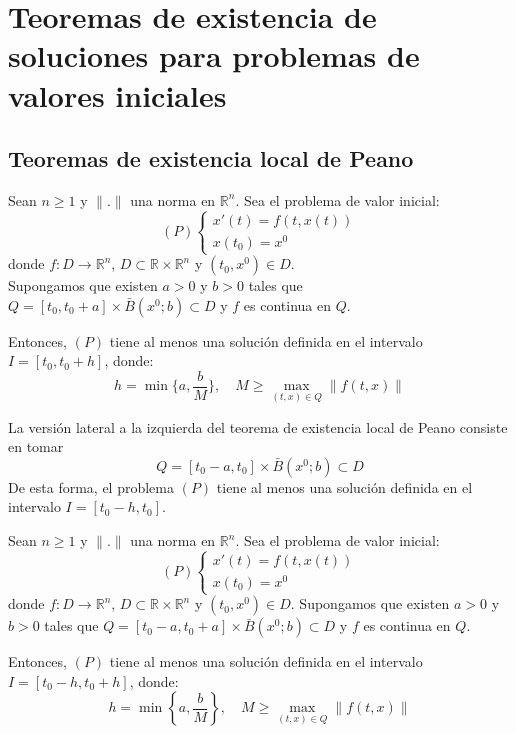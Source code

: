 \chapter{Teoremas de existencia de soluciones para problemas de valores iniciales}
\section{Teoremas de existencia local de Peano}
\begin{theorem}
    Sean $n \geq 1$ y $\|.\|$ una norma en $\mathbb{R}^n$.
    Sea el problema de valor inicial:
    $$(P) \begin{cases}
            x'(t) = f(t, x(t)) \\
            x(t_0) = x^0
        \end{cases}$$
    donde $f: D \to \mathbb{R}^n$, $D \subset \mathbb{R} \times \mathbb{R}^n$ y $(t_0, x^0) \in D$.\\
    Supongamos que existen $a > 0$ y $b > 0$ tales que $Q = [t_0, t_0 + a] \times \bar{B}(x^0; b) \subset D$ y $f$ es continua en $Q$.

    Entonces, $(P)$ tiene al menos una solución definida en el intervalo $I = [t_0, t_0 + h]$, donde:
    $$h = \min\{a, \frac{b}{M}\}, \quad M \geq \max_{(t, x) \in Q} \|f(t, x)\|$$
\end{theorem}

\begin{remark}
    La versión lateral a la izquierda del teorema de existencia local de Peano consiste en tomar
    $$Q = [t_0 - a, t_0] \times \bar{B}(x^0; b) \subset D$$
    De esta forma, el problema $(P)$ tiene al menos una solución definida en el intervalo $I = [t_0 - h, t_0]$.
\end{remark}

\begin{corollary}
    Sean $n \geq 1$ y $\|.\|$ una norma en $\mathbb{R}^n$.
    Sea el problema de valor inicial:
    $$(P) \begin{cases}
            x'(t) = f(t, x(t)) \\
            x(t_0) = x^0
        \end{cases}$$
    donde $f: D \to \mathbb{R}^n$, $D \subset \mathbb{R} \times \mathbb{R}^n$ y $(t_0, x^0) \in D$.
    Supongamos que existen $a > 0$ y $b > 0$ tales que $Q = [t_0 - a, t_0 + a] \times \bar{B}(x^0; b) \subset D$ y $f$ es continua en $Q$.

    Entonces, $(P)$ tiene al menos una solución definida en el intervalo $I = [t_0 - h, t_0 + h]$, donde:
    $$h = \min\left\{a, \frac{b}{M}\right\}, \quad M \geq \max_{(t, x) \in Q} \|f(t, x)\|$$
\end{corollary}


